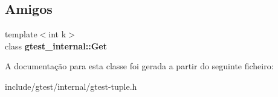 \subsection*{Amigos}
\begin{DoxyCompactItemize}
\item 
\hypertarget{classstd_1_1tr1_1_1tuple_aeeed38755abdaa78587dd1eac9ccc950}{{\footnotesize template$<$int k$>$ }\\class {\bfseries gtest\-\_\-internal\-::\-Get}}\label{classstd_1_1tr1_1_1tuple_aeeed38755abdaa78587dd1eac9ccc950}

\end{DoxyCompactItemize}


A documentação para esta classe foi gerada a partir do seguinte ficheiro\-:\begin{DoxyCompactItemize}
\item 
include/gtest/internal/gtest-\/tuple.\-h\end{DoxyCompactItemize}
